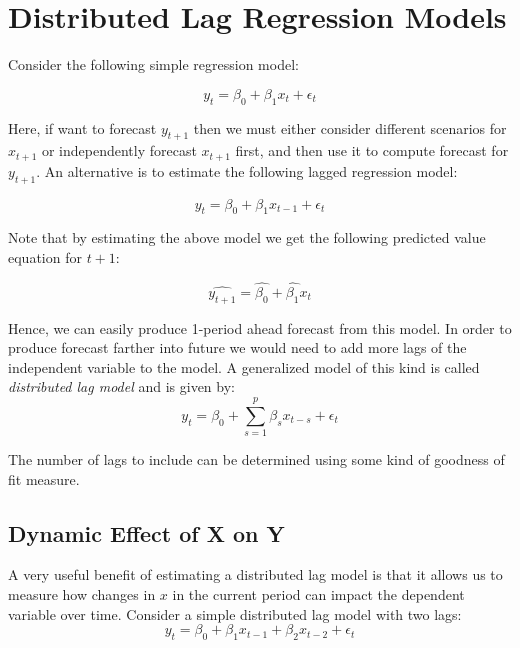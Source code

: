 \documentclass[]{book}
\theoremstyle{definition}
\theoremstyle{definition}
\theoremstyle{definition}
\theoremstyle{remark}
\begin{document}
\hypertarget{distributed-lag-regression-models}{%
\section{Distributed Lag Regression
Models}\label{distributed-lag-regression-models}}

Consider the following simple regression model:

\begin{equation}
y_t= \beta_0 +\beta_1 x_t + \epsilon_t
\end{equation}

Here, if want to forecast \(y_{t+1}\) then we must either consider
different scenarios for \(x_{t+1}\) or independently forecast
\(x_{t+1}\) first, and then use it to compute forecast for \(y_{t+1}\).
An alternative is to estimate the following lagged regression model:

\begin{equation}
y_t= \beta_0 +\beta_1 x_{t-1} + \epsilon_t
\end{equation}

Note that by estimating the above model we get the following predicted
value equation for \(t+1\):

\begin{equation}
\widehat{y_{t+1}}=\widehat{\beta_0}+\widehat{\beta_1}x_{t}
\end{equation}

Hence, we can easily produce 1-period ahead forecast from this model. In
order to produce forecast farther into future we would need to add more
lags of the independent variable to the model. A generalized model of
this kind is called \emph{distributed lag model} and is given by:
\begin{equation}
y_t= \beta_0 +\sum_{s=1}^p\beta_s x_{t-s} + \epsilon_t
\end{equation}

The number of lags to include can be determined using some kind of
goodness of fit measure.

\hypertarget{dynamic-effect-of-x-on-y}{%
\subsection{Dynamic Effect of X on Y}\label{dynamic-effect-of-x-on-y}}

A very useful benefit of estimating a distributed lag model is that it
allows us to measure how changes in \(x\) in the current period can
impact the dependent variable over time. Consider a simple distributed
lag model with two lags: \begin{equation}
y_t=\beta_0 + \beta_1 x_{t-1} + \beta_2 x_{t-2} +\epsilon_t
\end{equation}
\end{document}

